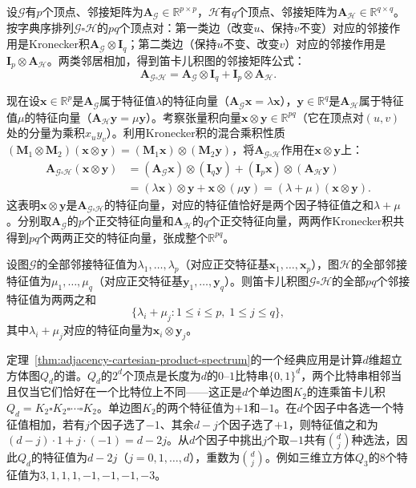 设$\mathcal G$有$p$个顶点、邻接矩阵为$\bm A_{\mathcal G}\in\mathbb R^{p\times p}$，$\mathcal H$有$q$个顶点、邻接矩阵为$\bm A_{\mathcal H}\in\mathbb R^{q\times q}$。按字典序排列$\mathcal G\square\mathcal H$的$pq$个顶点对：第一类边（改变$u$、保持$v$不变）对应的邻接作用是Kronecker积$\bm A_{\mathcal G}\otimes\bm I_q$；第二类边（保持$u$不变、改变$v$）对应的邻接作用是$\bm I_p\otimes\bm A_{\mathcal H}$。两类邻居相加，得到笛卡儿积图的邻接矩阵公式：
\begin{equation}
\bm A_{\mathcal G\square\mathcal H}
=\bm A_{\mathcal G}\otimes\bm I_q+\bm I_p\otimes\bm A_{\mathcal H}.
\label{eq:adjacency-cartesian-product}
\end{equation}

现在设$\bm x\in\mathbb R^p$是$\bm A_{\mathcal G}$属于特征值$\lambda$的特征向量（$\bm A_{\mathcal G}\bm x=\lambda\bm x$），$\bm y\in\mathbb R^q$是$\bm A_{\mathcal H}$属于特征值$\mu$的特征向量（$\bm A_{\mathcal H}\bm y=\mu\bm y$）。考察张量积向量$\bm x\otimes\bm y\in\mathbb R^{pq}$（它在顶点对$(u,v)$处的分量为乘积$x_u y_v$）。利用Kronecker积的混合乘积性质$(\bm M_1\otimes\bm M_2)(\bm x\otimes\bm y)=(\bm M_1\bm x)\otimes(\bm M_2\bm y)$，将$\bm A_{\mathcal G\square\mathcal H}$作用在$\bm x\otimes\bm y$上：
\[
\begin{aligned}
\bm A_{\mathcal G\square\mathcal H}(\bm x\otimes\bm y)
&=(\bm A_{\mathcal G}\bm x)\otimes(\bm I_q\bm y)+(\bm I_p\bm x)\otimes(\bm A_{\mathcal H}\bm y)\\
&=(\lambda\bm x)\otimes\bm y+\bm x\otimes(\mu\bm y)
=(\lambda+\mu)(\bm x\otimes\bm y).
\end{aligned}
\]
这表明$\bm x\otimes\bm y$是$\bm A_{\mathcal G\square\mathcal H}$的特征向量，对应的特征值恰好是两个因子特征值之和$\lambda+\mu$。分别取$\bm A_{\mathcal G}$的$p$个正交特征向量和$\bm A_{\mathcal H}$的$q$个正交特征向量，两两作Kronecker积共得到$pq$个两两正交的特征向量，张成整个$\mathbb R^{pq}$。

\begin{theorem}[笛卡儿积图的邻接谱]
\label{thm:adjacency-cartesian-product-spectrum}
设图$\mathcal G$的全部邻接特征值为$\lambda_1,\ldots,\lambda_p$（对应正交特征基$\bm x_1,\ldots,\bm x_p$），图$\mathcal H$的全部邻接特征值为$\mu_1,\ldots,\mu_q$（对应正交特征基$\bm y_1,\ldots,\bm y_q$）。则笛卡儿积图$\mathcal G\square\mathcal H$的全部$pq$个邻接特征值为两两之和
\[
\bigl\{\lambda_i+\mu_j:1\le i\le p,\;1\le j\le q\bigr\},
\]
其中$\lambda_i+\mu_j$对应的特征向量为$\bm x_i\otimes\bm y_j$。
\end{theorem}

定理~\ref{thm:adjacency-cartesian-product-spectrum}的一个经典应用是计算$d$维超立方体图$Q_d$的谱。$Q_d$的$2^d$个顶点是长度为$d$的$0$--$1$比特串$\{0,1\}^d$，两个比特串相邻当且仅当它们恰好在一个比特位上不同——这正是$d$个单边图$K_2$的连乘笛卡儿积$Q_d=K_2\square K_2\square\cdots\square K_2$。单边图$K_2$的两个特征值为$+1$和$-1$。在$d$个因子中各选一个特征值相加，若有$j$个因子选了$-1$、其余$d-j$个因子选了$+1$，则特征值之和为$(d-j)\cdot 1+j\cdot(-1)=d-2j$。从$d$个因子中挑出$j$个取$-1$共有$\binom{d}{j}$种选法，因此$Q_d$的特征值为$d-2j$（$j=0,1,\ldots,d$），重数为$\binom{d}{j}$。例如三维立方体$Q_3$的$8$个特征值为$3,1,1,1,-1,-1,-1,-3$。

